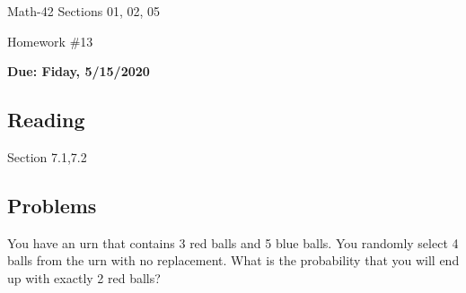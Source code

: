 \documentclass[letterpaper,12pt,fleqn]{article}
\begin{document}
\begin{center}
  \large
  Math-42 Sections 01, 02, 05

  \Large
  Homework \#13

  \large
  \textbf{Due: Fiday, 5/15/2020}
\end{center}

\subsection*{Reading}

Section 7.1,7.2

\subsection*{Problems}

You have an urn that contains 3 red balls and 5 blue balls.  You randomly select 4 balls from the urn with no
replacement.  What is the probability that you will end up with exactly 2 red balls?
\end{document}
